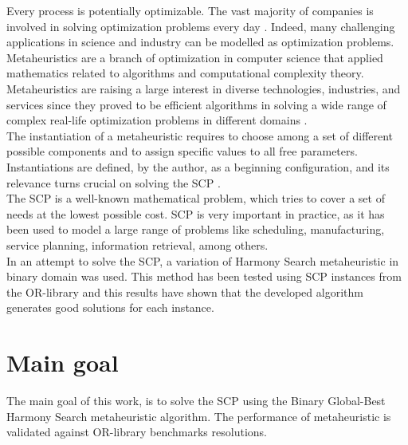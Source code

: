 Every process is potentially optimizable. The vast majority of companies is involved in solving optimization problems every day \cite{DBLP:books/daglib/0022645}. Indeed, many challenging applications in science and industry can be modelled as optimization problems.\\

Metaheuristics are a branch of optimization in computer science that applied mathematics related to algorithms and computational complexity theory. Metaheuristics are raising a large interest in diverse technologies, industries, and services since they proved to be efficient algorithms in solving a wide range of  complex real-life optimization problems in different domains \cite{DBLP:journals/pai/Torres-JimenezP14}.\\

The instantiation of a metaheuristic requires to choose among a set of different possible components and to assign specific values to all free parameters. Instantiations are defined, by the author, as a beginning configuration, and its relevance turns crucial on solving the SCP \cite{DBLP:conf/gecco/BirattariSPV02}.\\

The SCP is a well-known mathematical problem, which tries to cover a set of needs at the lowest possible cost. SCP is very important in practice, as it has been used to model a large range of problems like scheduling, manufacturing, service planning, information retrieval, among others.\\

In an attempt to solve the SCP, a variation of Harmony Search metaheuristic in binary domain  was used. This method has been tested using SCP instances from the OR-library \cite{citeulike:921349} and this results have shown that the developed algorithm generates good solutions for each instance.

\section{Main goal}
The main goal of this work, is to solve the SCP using the Binary Global-Best Harmony Search metaheuristic algorithm. The performance of metaheuristic is validated against OR-library benchmarks resolutions.


